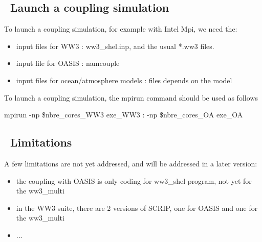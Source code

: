 \vssub
\subsection{~Launch a coupling simulation} \label{sec:couplingC}
\vssub

To launch a coupling simulation, for example with Intel Mpi, we need the: 

\begin{itemize}
\item input files for WW3 : {\file ww3\_shel.inp}, and the usual *.ww3 files.
\item input file for OASIS : {\file namcouple}
\item input files for ocean/atmosphere models : {\file files depends on the model}
\end{itemize}

To launch a coupling simulation, the {\file mpirun} command should be used as follows

{\code mpirun -np \$nbre\_cores\_WW3 exe\_WW3 : -np \$nbre\_cores\_OA exe\_OA}

\vssub
\subsection{~Limitations} \label{sec:couplingD}
\vssub

A few limitations are not yet addressed, and will be addressed in a later version:

\begin{itemize}
\item the coupling with OASIS is only coding for ww3\_shel program, not yet for the {\code ww3\_multi}
\item in the WW3 suite, there are 2 versions of SCRIP, one for OASIS and one for the {\code ww3\_multi}
\item ...
\end{itemize}
